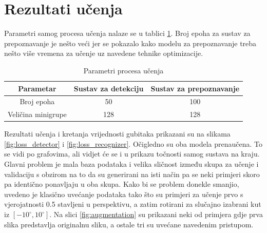 \documentclass[times, utf8, diplomski]{fer}
\begin{document}
\section{Rezultati učenja}
Parametri samog procesa učenja nalaze se u tablici \ref{tab:train}. Broj epoha za sustav za prepoznavanje je nešto veći jer se pokazalo kako modelu za prepoznavanje treba nešto više vremena za učenje uz navedene tehnike optimizacije.

\begin{table}[H]
    \centering
    \begin{tabular}{|c|c|c|}
        \hline
        Parametar & Sustav za detekciju & Sustav za prepoznavanje \\
        \hline \hline
        Broj epoha & 50 & 100 \\
        \hline
        Veličina minigrupe & 128 & 128 \\
        \hline
    \end{tabular}
    \caption{Parametri procesa učenja}
    \label{tab:train}
\end{table}

Rezultati učenja i kretanja vrijednosti gubitaka prikazani su na slikama \ref{fig:loss_detector} i \ref{fig:loss_recognizer}. Očigledno su oba modela prenaučena. To se vidi po grafovima, ali vidjet će se i u prikazu točnosti samog sustava na kraju. Glavni problem je mala baza podataka i velika sličnost između skupa za učenje i validaciju s obzirom na to da su generirani na isti način pa se neki primjeri skoro pa identično ponavljaju u oba skupa. Kako bi se problem donekle smanjio, uvedeno je klasično uvećanje podataka  tako što su primjeri za učenje prvo s vjerojatnosti 0.5 stavljeni u perspektivu, a zatim rotirani za slučajno izabrani kut iz $[-10^\circ, 10^\circ]$. Na slici \ref{fig:augmentation} su prikazani neki od primjera gdje prva slika predstavlja originalnu sliku, a ostale tri su uvećane navedenim pristupom.

\bigskip
\end{document}
